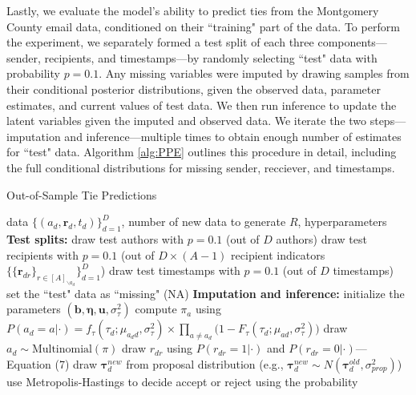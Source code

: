 \documentclass[12pt]{article}
\begin{document}
{Lastly, we evaluate the model's ability to predict ties from the Montgomery County email data, conditioned on their ``training" part of the data. To perform the experiment, we separately formed a test split of each three components---sender, recipients, and timestamps---by randomly selecting ``test" data with probability $p=0.1$. Any missing variables were imputed by drawing samples from their conditional posterior distributions, given the observed data, parameter estimates, and current values of test data. We then run inference to update the latent variables given the imputed and observed data. We iterate the two steps---imputation and inference---multiple times to obtain enough number of estimates for ``test" data. Algorithm \ref{alg:PPE} outlines this procedure in detail, including the full conditional distributions for missing sender, recciever, and timestamps.	
	\begin{algorithm}[!t]
		\caption{Out-of-Sample Tie Predictions}
		\label{alg:PPE}
		\begin{algorithmic}
			 data $ \{ (a_d, \boldsymbol{r}_d, t_d)\}_{d=1}^D$, 
			number of new data to generate $R$,
			hyperparameters
			\vskip 0.1in
			\textbf{Test splits:}	
			\STATE draw test authors with $p=0.1$ (out of $D$ authors) 
			\STATE draw test recipients
			with $p=0.1$ (out of $D\times (A-1)$ recipient indicators $\{\{\boldsymbol{r}_{dr}\}_{r\in [A]_{\backslash a_d}}\}_{d=1}^D$)
			\STATE draw test timestamps with $p=0.1$  (out of $D$ timestamps) 
			\STATE set the ``test" data as ``missing" (NA)
			\vskip 0.1in
			\textbf{Imputation and inference:}	
			\STATE initialize the parameters $(\boldsymbol{b}, \boldsymbol{\eta}, \boldsymbol{u}, \sigma^2_\tau)$
			\STATE compute $\pi_{a} $ using $P(a_d= a | \cdot)=f_{\tau}(\tau_{d}; \mu_{a_dd}, \sigma_\tau^2)\times \prod_{a\neq a_d}\big(1-F_{\tau}(\tau_{d}; \mu_{a d}, \sigma_\tau^2) \big)$
			\ENDFOR
			\STATE draw $a_d \sim \mbox{Multinomial}(\pi)$
			\ENDIF
			\STATE draw $r_{dr}$ using $P(r_{dr}= 1 | \cdot)$ and $P(r_{dr}= 0| \cdot)$---Equation (7)
			\ENDIF
			\ENDFOR
			\STATE draw $\boldsymbol{\tau}^{new}_d$ from proposal distribution (e.g., $\boldsymbol{\tau}^{new}_d \sim N(\boldsymbol{\tau}^{old}_d, \sigma^2_{prop})$)
			\STATE use Metropolis-Hastings to decide accept or reject using the probability
			\begin{equation*}

\end{equation*}
\end{algorithmic}
\end{algorithm}}
\end{document}
